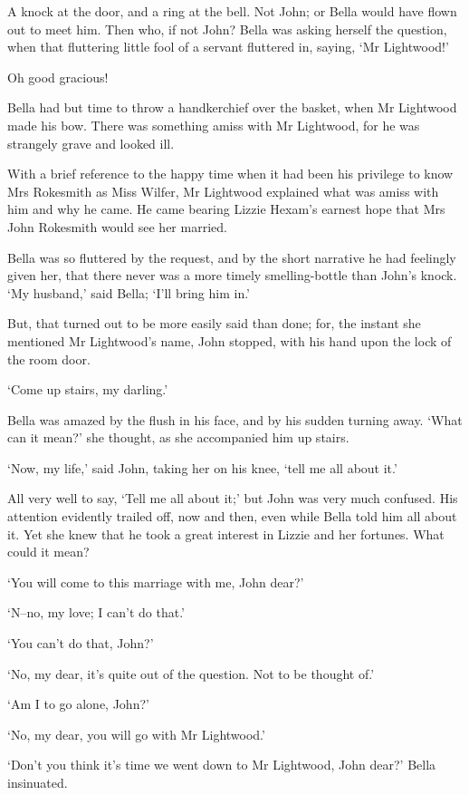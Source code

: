 A knock at the door, and a ring at the bell. Not John; or Bella would
have flown out to meet him. Then who, if not John? Bella was asking
herself the question, when that fluttering little fool of a servant
fluttered in, saying, ‘Mr Lightwood!’

Oh good gracious!

Bella had but time to throw a handkerchief over the basket, when Mr
Lightwood made his bow. There was something amiss with Mr Lightwood, for
he was strangely grave and looked ill.

With a brief reference to the happy time when it had been his privilege
to know Mrs Rokesmith as Miss Wilfer, Mr Lightwood explained what was
amiss with him and why he came. He came bearing Lizzie Hexam’s earnest
hope that Mrs John Rokesmith would see her married.

Bella was so fluttered by the request, and by the short narrative he had
feelingly given her, that there never was a more timely smelling-bottle
than John’s knock. ‘My husband,’ said Bella; ‘I’ll bring him in.’

But, that turned out to be more easily said than done; for, the instant
she mentioned Mr Lightwood’s name, John stopped, with his hand upon the
lock of the room door.

‘Come up stairs, my darling.’

Bella was amazed by the flush in his face, and by his sudden turning
away. ‘What can it mean?’ she thought, as she accompanied him up stairs.

‘Now, my life,’ said John, taking her on his knee, ‘tell me all about
it.’

All very well to say, ‘Tell me all about it;’ but John was very much
confused. His attention evidently trailed off, now and then, even while
Bella told him all about it. Yet she knew that he took a great interest
in Lizzie and her fortunes. What could it mean?

‘You will come to this marriage with me, John dear?’

‘N--no, my love; I can’t do that.’

‘You can’t do that, John?’

‘No, my dear, it’s quite out of the question. Not to be thought of.’

‘Am I to go alone, John?’

‘No, my dear, you will go with Mr Lightwood.’

‘Don’t you think it’s time we went down to Mr Lightwood, John dear?’
Bella insinuated.

